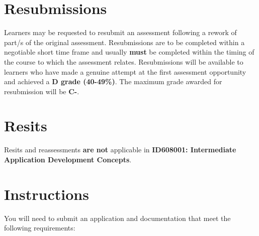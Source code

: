 \documentclass{article}
\begin{document}
\section*{Resubmissions}
Learners may be requested to resubmit an assessment following a rework of part/s of the original assessment. Resubmissions are to be completed within a negotiable short time frame and usually \textbf{must} be completed within the timing of the course to which the assessment relates. Resubmissions will be available to learners who have made a genuine attempt at the first assessment opportunity and achieved a \textbf{D grade (40-49\%)}. The maximum grade awarded for resubmission will be \textbf{C-}.

\section*{Resits}
Resits and reassessments \textbf{are not} applicable in \textbf{ID608001: Intermediate Application Development Concepts}.

\section*{Instructions}
You will need to submit an application and documentation that meet the following requirements:
\end{document}
